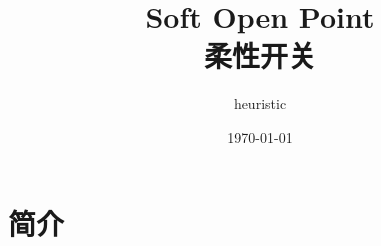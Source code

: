 \documentclass[UTF8]{ctexart}
\author{heuristic}
\title{Soft Open Point \\ 柔性开关}
\date{\today}
\begin{document}
\maketitle
\newpage
\part{简介}
\end{document}
